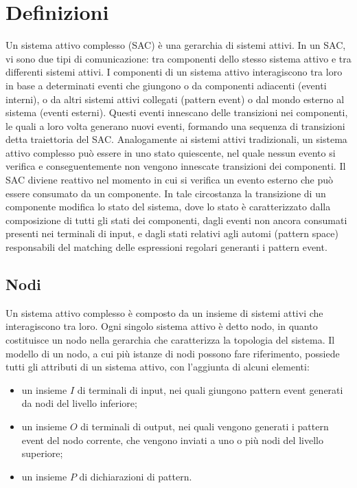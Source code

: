 \section{Definizioni}
Un sistema attivo complesso (SAC) è una gerarchia di sistemi attivi. In un SAC, vi sono due tipi di comunicazione: tra componenti dello stesso sistema attivo e tra differenti sistemi attivi. 
I componenti di un sistema attivo interagiscono tra loro in base a determinati eventi che giungono o da componenti adiacenti (eventi interni), o da altri sistemi attivi collegati (pattern event) o dal mondo esterno al sistema (eventi esterni). Questi eventi innescano delle transizioni nei componenti, le quali a loro volta generano nuovi eventi, formando una sequenza di transizioni detta traiettoria del SAC.
Analogamente ai sistemi attivi tradizionali, un sistema attivo complesso può essere in uno stato quiescente, nel quale nessun evento si verifica e conseguentemente non vengono innescate transizioni dei componenti.
Il SAC diviene reattivo nel momento in cui si verifica un evento esterno che può essere consumato da un componente. In tale circostanza la transizione di un componente modifica lo stato del sistema, dove lo stato è caratterizzato dalla composizione di tutti gli stati dei componenti, dagli eventi non ancora consumati presenti nei terminali di input, e dagli stati relativi agli automi (pattern space) responsabili del matching delle espressioni regolari generanti i pattern event. 

\subsection{Nodi}
Un sistema attivo complesso è composto da un insieme di sistemi attivi che interagiscono tra loro. Ogni singolo sistema attivo è detto nodo, in quanto costituisce un nodo nella gerarchia che caratterizza la topologia del sistema.
Il modello di un nodo, a cui più istanze di nodi possono fare riferimento, possiede tutti gli attributi di un sistema attivo, con l'aggiunta di alcuni elementi:
\begin{itemize}
\item un insieme $I$ di terminali di input, nei quali giungono pattern event generati da nodi del livello inferiore;
\item un insieme $O$ di terminali di output, nei quali vengono generati i pattern event del nodo corrente, che vengono inviati a uno o più nodi del livello superiore;
\item un insieme $P$ di dichiarazioni di pattern.
\end{itemize}


